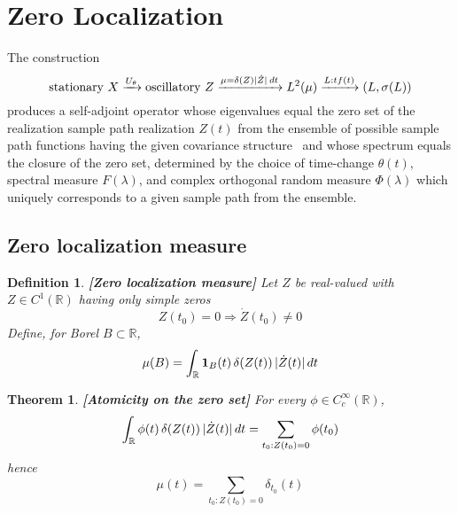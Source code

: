 \documentclass{article}
\newcommand{\tmstrong}[1]{\textbf{#1}}
\newcommand{\tmtextbf}[1]{\text{{\bfseries{#1}}}}
\newtheorem{definition}{Definition}
\newtheorem{theorem}{Theorem}
\begin{document}
\section{Zero Localization}\label{sec:HP}

The construction
\begin{equation}
  \text{stationary } X \xrightarrow{U_{\theta}} \text{oscillatory } Z
  \xrightarrow{\mu = \delta (Z) | \dot{Z} |  \hspace{0.17em} dt} L^2 (\mu)
  \xrightarrow{L : t f (t)} (L, \sigma (L))
\end{equation}
produces a self-adjoint operator whose eigenvalues equal the zero set of the
realization sample path realization $Z (t)$ from the ensemble of possible
sample path functions having the given covariance structure \ and whose
spectrum equals the closure of the zero set, determined by the choice of
time-change $\theta (t)$, spectral measure $F (\lambda)$, and complex
orthogonal random measure $\Phi (\lambda)$ which uniquely corresponds to a
given sample path from the ensemble.

\subsection{Zero localization measure}

\begin{definition}
  {\tmstrong{[Zero localization measure]\label{def:zeromeasure}}} Let $Z$ be
  real-valued with $Z \in C^1 (\mathbb{R})$ having only simple zeros
  \begin{equation}
    Z (t_0) = 0 \Rightarrow \dot{Z} (t_0) \neq 0
  \end{equation}
  Define, for Borel $B \subset \mathbb{R}$,
  \begin{equation}
    \mu (B) = \int_{\mathbb{R}} \text{\tmtextbf{1}}_B (t)  \hspace{0.17em}
    \delta (Z (t)) \hspace{0.17em} | \dot{Z} (t) |  \hspace{0.17em} dt
  \end{equation}
\end{definition}

\begin{theorem}
  {\tmstrong{[Atomicity on the zero set]\label{thm:atomic}}} For every $\phi
  \in C_c^{\infty} (\mathbb{R})$,
  \begin{equation}
    \int_{\mathbb{R}} \phi (t)  \hspace{0.17em} \delta (Z (t)) \hspace{0.17em}
    | \dot{Z} (t) |  \hspace{0.17em} dt = \sum_{t_0 : Z (t_0) = 0} \phi (t_0)
  \end{equation}
  hence
  \begin{equation}
    \mu (t) = \sum_{t_0 : Z (t_0) = 0} \delta_{t_0} (t)
  \end{equation}
\end{theorem}
\end{document}
